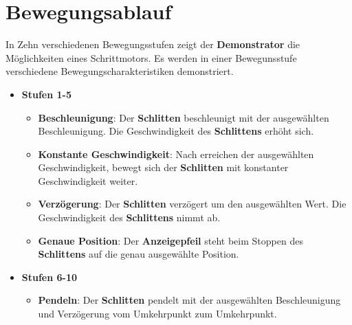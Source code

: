 %
%

\chapter{Bewegungsablauf}

In Zehn verschiedenen Bewegungsstufen zeigt der \textbf{Demonstrator} die Möglichkeiten eines Schrittmotors. Es werden in einer Bewegunsstufe verschiedene Bewegungscharakteristiken demonstriert. 

\begin{itemize}
\item \textbf{Stufen 1-5}
	\begin{itemize}
\item\textbf{Beschleunigung}: Der \textbf{Schlitten} beschleunigt mit der ausgewählten Beschleunigung. Die Geschwindigkeit des \textbf{Schlittens} erhöht sich. 
	
	\item\textbf{Konstante Geschwindigkeit}: Nach erreichen der ausgewählten Geschwindigkeit, bewegt sich der \textbf{Schlitten} mit konstanter Geschwindigkeit weiter.
		
		\item\textbf{Verzögerung}: Der \textbf{Schlitten} verzögert um den ausgewählten Wert. Die Geschwindigkeit des \textbf{Schlittens} nimmt ab.
			
			\item\textbf{Genaue Position}: Der \textbf{Anzeigepfeil} steht beim Stoppen des \textbf{Schlittens} auf die genau ausgewählte Position.
\end{itemize}
\end{itemize}
\begin{itemize}
	\item \textbf{Stufen 6-10}
	\begin{itemize}
	\item\textbf{Pendeln}: Der \textbf{Schlitten} pendelt mit der ausgewählten Beschleunigung und Verzögerung vom Umkehrpunkt zum Umkehrpunkt.
\end{itemize}
\end{itemize}			
	
